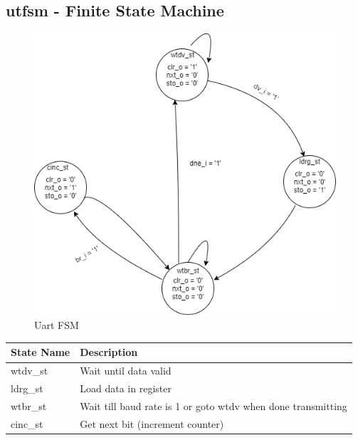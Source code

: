 \documentclass[12pt,a4 paper] {report}
\begin{document}
\subsection*{utfsm - Finite State Machine}
\begin{figure}[h]
	\centering	
	\includegraphics[scale=0.5]{../png/uart.png}
	\caption{Uart FSM}
\end{figure}
\begin{center}
 \begin{tabular}{| p{4cm} | p{7cm} |}
	 \hline
	 \textbf{State Name} & \textbf{Description} \\
	 \hline
	 wtdv\_st & Wait until data valid \\
	 \hline
	 ldrg\_st & Load data in register \\
	 \hline
	 wtbr\_st & Wait till baud rate is 1 or goto wtdv when done transmitting \\
	 \hline
	 cinc\_st & Get next bit (increment counter) \\
	 \hline
 \end{tabular}
\end{center}

\newpage
\end{document}
